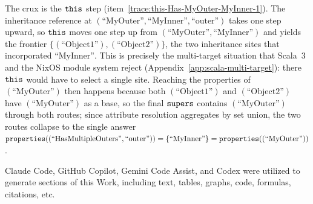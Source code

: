 \begin{remark}
  The crux is the $\mathtt{this}$ step (item~\ref{trace:this-Has-MyOuter-MyInner-1}).
  The inheritance reference at
  $(\text{``MyOuter''}, \text{``MyInner''}, \text{``outer''})$ takes one step
  upward, so $\mathtt{this}$ moves one step up from
  $(\text{``MyOuter''}, \text{``MyInner''})$ and yields the frontier
  $\{(\text{``Object1''}), (\text{``Object2''})\}$, the two inheritance
  sites that incorporated $\text{``MyInner''}$. This is precisely the
  multi-target situation that Scala~3 and the NixOS module system reject
  (Appendix~\ref{app:scala-multi-target}): there $\mathtt{this}$ would have to
  select a single site. Reaching the properties of $(\text{``MyOuter''})$
  then happens because both $(\text{``Object1''})$ and
  $(\text{``Object2''})$ have $(\text{``MyOuter''})$ as a base, so the final
  $\mathtt{supers}$ contains $(\text{``MyOuter''})$ through both routes; since
  attribute resolution aggregates by set union, the two routes collapse to
  the single answer
  $\mathtt{properties}((\text{``HasMultipleOuters''}, \text{``outer''}))
  = \{\text{``MyInner''}\} = \mathtt{properties}((\text{``MyOuter''}))$.
\end{remark}

\begin{acks}
  Claude Code, GitHub Copilot, Gemini Code Assist, and Codex were utilized to generate sections of this Work,
  including text, tables, graphs, code, formulas, citations, etc.
\end{acks}


